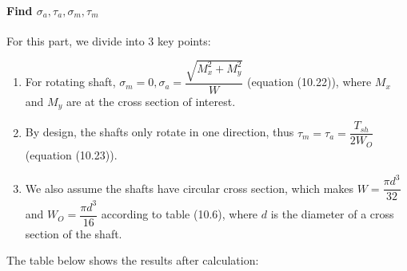 \paragraph{Find $ \sigma_{a}, \tau_{a}, \sigma_{m}, \tau_{m} $} For this part, we divide into 3 key points:
\begin{enumerate}
	\item For rotating shaft, $ \sigma_{m} = 0, \sigma_a = \dfrac{\sqrt{M_x^2+M_y^2}}{W} $ (equation (10.22)), where $ M_x $ and $ M_y $ are at the cross section of interest.
	\item By design, the shafts only rotate in one direction, thus $ \tau_m = \tau_a = \dfrac{T_{sh}}{2W_O} $ (equation (10.23)).
	\item We also assume the shafts have circular cross section, which makes $ W = \dfrac{\pi d^3}{32} $ and $ W_O = \dfrac{\pi d^3}{16} $ according to table (10.6), where $ d $ is the diameter of a cross section of the shaft.
\end{enumerate}
The table below shows the results after calculation:
